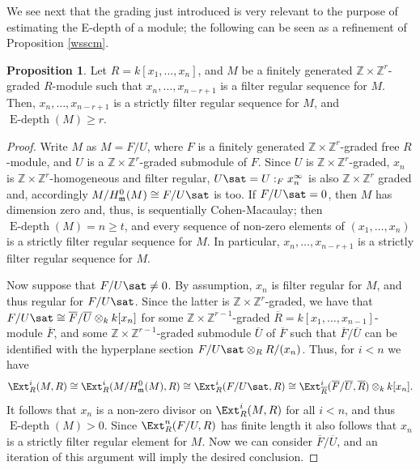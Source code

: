 \documentclass[12pt]{amsart}
\theoremstyle{definition}
\newtheorem{proposition}[theorem]{Proposition}
\theoremstyle{definition}
\newcommand{\m}{\mathfrak{m}}
\def\NZQ{\mathbb}               %
\def\ZZ{{\NZQ Z}}
\newcommand{\ov}[1]{\overline{{#1}}}
\renewcommand{\geq}{\geqslant}
\let\ov\overline
\DeclareMathOperator{\Edepth}{E-depth}
\begin{document}
We see next that the grading just introduced  is very relevant to the purpose of estimating the E-depth of a module; the following can be seen as  a refinement of Proposition \ref{wsscm}.
\begin{proposition} \label{Edepth graded}
Let $R=k[x_1,\ldots,x_n]$, and $M$ be a finitely generated $\ZZ \times \ZZ^r$-graded $R$-module such that $x_n,\ldots,x_{n-r+1}$ is a filter regular sequence for $M$. Then, $x_n,\ldots,x_{n-r+1}$ is a strictly filter regular sequence for $M$, and $\Edepth(M) \geq r$.
\end{proposition}
\begin{proof}
  Write $M$ as $M=F/U$, where $F$ is a finitely generated $\ZZ \times \ZZ^r$-graded free $R$-module, and $U$ is a $\ZZ \times \ZZ^r$-graded submodule of $F$. Since $U$ is $\ZZ \times \ZZ^r$-graded, $x_n$ is $\ZZ\times \ZZ^r$-homogeneous and filter regular, $U\sat= U:_F x_n^{\infty}$ is also $\ZZ\times \ZZ^r$ graded and, accordingly $M/H^0_\m(M) \cong F/U\sat$ is too. If $F/U\sat=0$, then $M$ has dimension zero and, thus, is  sequentially Cohen-Macaulay; then  $\Edepth(M) = n \geq t$, and every sequence of non-zero elements of $(x_1,\ldots,x_n)$ is a strictly filter regular sequence for $M$. In particular, $x_n,\ldots,x_{n-r+1}$ is a strictly filter regular sequence for $M$.

Now suppose that $F/U\sat \ne 0$. By assumption, $x_n$ is filter regular for $M$, and thus regular for $F/U\sat$. Since the latter is $\ZZ \times \ZZ^r$-graded, we have that $F/U\sat \cong \ov{F}/\ov{U} \otimes_k k[x_n]$ for some $\ZZ \times \ZZ^{r-1}$-graded $\ov{R}=k[x_1,\ldots,x_{n-1}]$-module $\ov{F}$, and some $\ZZ\times \ZZ^{r-1}$-graded submodule $\ov{U}$ of $\ov{F}$ such that $\ov{F}/\ov{U}$ can be identified with the hyperplane section $F/U\sat \otimes_R R/(x_n)$. Thus, for $i<n$ we have
\[
\Ext^i_R(M,R) \cong \Ext^i_R(M/H^0_\m(M),R) \cong \Ext^i_R(F/U\sat,R) \cong \Ext_{\ov{R}}^i(\ov{F}/\ov{U},\ov{R}) \otimes_k k[x_n].
\]
It follows that $x_n$ is a non-zero divisor on $\Ext^i_R(M,R)$ for all $i<n$, and thus $\Edepth(M)>0$. Since $\Ext^n_R(F/U,R)$ has finite length it also follows that $x_n$ is a strictly filter regular element for $M$. Now we can consider $\ov{F}/\ov{U}$, and an iteration of this argument will imply the desired conclusion.
\end{proof}
\end{document}
